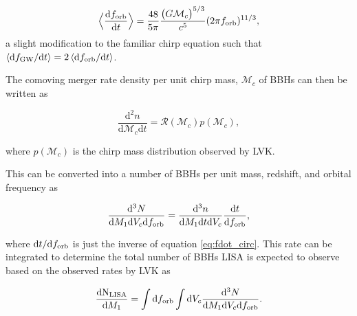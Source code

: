\documentclass[twocolumn]{aastex631}
\begin{document}
\begin{equation}
    \Big\langle\frac{\mathrm{d}f_{\rm orb}}{\mathrm{d}t}\Big\rangle = \frac{48}{5 \pi} \frac{\big(G \mathcal{M}_c \big)^{5/3}}{c^5} (2 \pi f_{\rm orb})^{11/3}, 
    \label{eq:fdot_circ}
\end{equation}
\noindent a slight modification to the familiar chirp equation such that $\langle\mathrm{d}f_{\rm GW}/\mathrm{d}t\rangle = 2\,\langle\mathrm{d}f_{\rm orb}/\mathrm{d}t\rangle$. 

The comoving merger rate density per unit chirp mass, $\mathcal{M}_c$ of BBHs can then be written as

\begin{equation}
    \frac{\mathrm{d}^2n}{\mathrm{d}\mathcal{M}_c \mathrm{d}t} = \mathcal{R}(\mathcal{M}_c) p(\mathcal{M}_c),
    \label{eq:merger_rate_density}
\end{equation}

\noindent where $p(\mathcal{M}_c)$ is the chirp mass distribution observed by LVK. 

This can be converted into a number of BBHs per unit mass, redshift, and orbital frequency as

\begin{equation}
    \frac{\mathrm{d}^3N}{\mathrm{d}M_1 \mathrm{d}V_c \mathrm{d}f_{\rm orb}} = \frac{\mathrm{d}^3n}{\mathrm{d}M_1 \mathrm{d}t \mathrm{d}V_c} \frac{\mathrm{d}t}{\mathrm{d}f_{\rm orb}},
    \label{eq:rate_per_freq}
\end{equation}

where $\mathrm{d}t / \mathrm{d}f_{\rm orb}$ is just the inverse of equation \ref{eq:fdot_circ}. This rate can be integrated to determine the total number of BBHs LISA is expected to observe based on the observed rates by LVK as 

\begin{equation}
    \frac{\mathrm{dN_{LISA}}}{\mathrm{d}M_1}= \int\mathrm{d}f_{\rm orb} \int\mathrm{d}V_{c} \frac{\mathrm{d}^3N}{\mathrm{d}M_1 \mathrm{d}V_c \mathrm{d}f_{\rm orb}}.
\end{equation}
\end{document}
